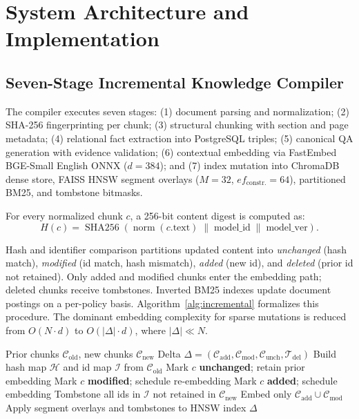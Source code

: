 \documentclass[journal]{IEEEtran}
\begin{document}
\section{System Architecture and Implementation}

\subsection{Seven-Stage Incremental Knowledge Compiler}
The compiler executes seven stages: (1) document parsing and normalization; (2) SHA-256 fingerprinting per chunk; (3) structural chunking with section and page metadata; (4) relational fact extraction into PostgreSQL triples; (5) canonical QA generation with evidence validation; (6) contextual embedding via FastEmbed BGE-Small English ONNX ($d=384$); and (7) index mutation into ChromaDB dense store, FAISS HNSW segment overlays ($M=32$, $ef_{\text{constr.}}=64$), partitioned BM25, and tombstone bitmasks.

For every normalized chunk $c$, a 256-bit content digest is computed as:
\begin{equation}
  H(c)=\operatorname{SHA256}(\operatorname{norm}(c.\text{text})\;\|\;\text{model\_id}\;\|\;\text{model\_ver}).
  \label{eq:hash}
\end{equation}

Hash and identifier comparison partitions updated content into \emph{unchanged} (hash match), \emph{modified} (id match, hash mismatch), \emph{added} (new id), and \emph{deleted} (prior id not retained). Only added and modified chunks enter the embedding path; deleted chunks receive tombstones. Inverted BM25 indexes update document postings on a per-policy basis. Algorithm~\ref{alg:incremental} formalizes this procedure. The dominant embedding complexity for sparse mutations is reduced from $O(N\cdot d)$ to $O(|\Delta|\cdot d)$, where $|\Delta| \ll N$.

\begin{algorithm}[!t]
\caption{Incremental Policy Knowledge Compilation}
\label{alg:incremental}
\begin{algorithmic}[1]
\scriptsize
\REQUIRE Prior chunks $\mathcal{C}_{\text{old}}$, new chunks $\mathcal{C}_{\text{new}}$
\ENSURE Delta $\Delta=(\mathcal{C}_{\text{add}},\mathcal{C}_{\text{mod}},
        \mathcal{C}_{\text{unch}},\mathcal{T}_{\text{del}})$
\STATE Build hash map $\mathcal{H}$ and id map $\mathcal{I}$ from $\mathcal{C}_{\text{old}}$
    \STATE Mark $c$ \textbf{unchanged}; retain prior embedding
    \STATE Mark $c$ \textbf{modified}; schedule re-embedding
  \ELSE
    \STATE Mark $c$ \textbf{added}; schedule embedding
  \ENDIF
\ENDFOR
\STATE Tombstone all ids in $\mathcal{I}$ not retained in $\mathcal{C}_{\text{new}}$
\STATE Embed only $\mathcal{C}_{\text{add}}\cup\mathcal{C}_{\text{mod}}$
\STATE Apply segment overlays and tombstones to HNSW index
\RETURN $\Delta$
\end{algorithmic}
\end{algorithm}
\end{document}
